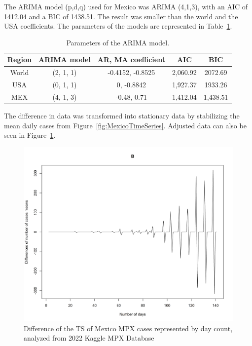 \documentclass[conference]{IEEEtran}
\begin{document}
The ARIMA model (p,d,q) used for Mexico was ARIMA (4,1,3), with an AIC of 1412.04 and a BIC of 1438.51. The result was smaller than the world and the USA coefficients. The parameters of the models are represented in Table~\ref{Table:parameters}.

\begin{table}[h!]
    \centering
    \caption{Parameters of the ARIMA model.}
    \label{Table:parameters}
    \begin{tabular}{|c|c|c|c|c|}
    
    \hline
        Region & ARIMA model &  AR, MA coefficient & AIC & BIC\\
    \hline
        World & (2, 1, 1) & -0.4152, -0.8525 & 2,060.92 & 2072.69\\
    \hline
        USA & (0, 1, 1) & 0, -0.8842 & 1,927.37 & 1933.26\\   
    \hline
        MEX & (4, 1, 3) & -0.48, 0.71 & 1,412.04 & 1,438.51\\
     \hline
    \end{tabular}
\end{table}

The difference in data was transformed into stationary data by stabilizing the mean daily cases from Figure~\ref{fig:MexicoTimeSeries}. Adjusted data can also be seen in Figure~\ref{fig:Differences}. 
\begin{figure}[H]
    \centering
    \includegraphics[width = 8 cm]{Differences.png}
    \caption{Difference of the TS of Mexico MPX cases represented by day count, analyzed from 2022 Kaggle MPX Database~\cite{Contractor2022}}
    \label{fig:Differences}
\end{figure}
\end{document}
